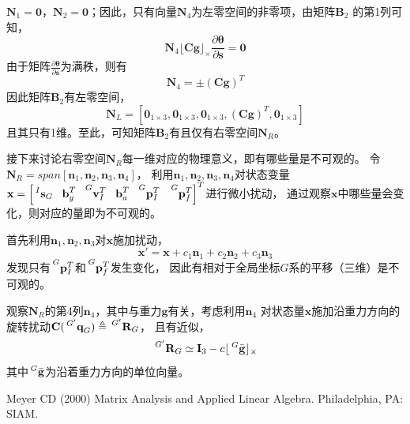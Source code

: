 \documentclass{article}
\begin{document}
$\textbf{N}_1=\textbf{0}$，$\textbf{N}_2=\textbf{0}$；因此，只有向量$\textbf{N}_4$为左零空间的非零项，由矩阵$\textbf{B}_2$
的第1列可知，
\begin{equation}
    \textbf{N}_{4}\lfloor\textbf{Cg}\rfloor_{\times}\frac{\partial\mathbf{\theta}}{\partial\textbf{s}}=\textbf{0}
\end{equation}
由于矩阵$\frac{\partial\mathbf{\theta}}{\partial\textbf{s}}$为满秩，则有
\begin{equation}
    \textbf{N}_4=\pm(\textbf{Cg})^T
\end{equation}
因此矩阵$\textbf{B}_2$有左零空间，
\begin{equation}
    \textbf{N}_L=\left[\textbf{0}_{1\times 3},\textbf{0}_{1\times 3},\textbf{0}_{1\times 3},(\textbf{Cg})^T,\textbf{0}_{1\times 3}\right]
\end{equation}
且其只有1维。至此，可知矩阵$\textbf{B}_2$有且仅有右零空间$\textbf{N}_R$。

\par
接下来讨论右零空间$\textbf{N}_R$每一维对应的物理意义，即有哪些量是不可观的。
令$\textbf{N}_R=span\left[\textbf{n}_{1},\textbf{n}_{2},\textbf{n}_{3},\textbf{n}_{4}\right]$，
利用$\textbf{n}_{1},\textbf{n}_{2},\textbf{n}_{3},\textbf{n}_{4}$对状态变量
$\textbf{x}=\left[\sideset{^I}{}{\mathop{\textbf{s}_{G}}}\ \ \textbf{b}_{g}^{T}
\ \ \sideset{^G}{}{\mathop{\textbf{v}_{I}^{T}}}\ \ \textbf{b}_{a}^{T}\ \ \sideset{^G}{}{\mathop{\textbf{p}_{I}^{T}}}
\ \ \sideset{^G}{}{\mathop{\textbf{p}_{f}^{T}}}\right]^T$进行微小扰动，
通过观察$\textbf{x}$中哪些量会变化，则对应的量即为不可观的。
\par
首先利用$\textbf{n}_{1},\textbf{n}_{2},\textbf{n}_{3}$对$\textbf{x}$施加扰动，
\begin{equation}
    \textbf{x}'=\textbf{x}+c_1\textbf{n}_1+c_2\textbf{n}_2+c_3\textbf{n}_3
\end{equation}
发现只有$\sideset{^G}{}{\mathop{\textbf{p}_{I}^{T}}}$和$\sideset{^G}{}{\mathop{\textbf{p}_{f}^{T}}}$发生变化，
因此有相对于全局坐标$G$系的平移（三维）是不可观的。
\par
观察$\textbf{N}_R$的第4列$\textbf{n}_4$，其中与重力$\textbf{g}$有关，考虑利用$\textbf{n}_4$
对状态量$\textbf{x}$施加沿重力方向的旋转扰动$\textbf{C}(\sideset{^{G'}}{}{\mathop{\textbf{q}_G}})\triangleq\sideset{^{G'}}{}{\mathop{\textbf{R}_G}}$，
且有近似，
\begin{equation}
    \sideset{^{G'}}{}{\mathop{\textbf{R}_G}}\simeq \textbf{I}_3-c\lfloor\sideset{^G}{}{\mathop{\bar{\textbf{g}}}}\rfloor_{\times}
\end{equation}
其中$\sideset{^G}{}{\mathop{\bar{\textbf{g}}}}$为沿着重力方向的单位向量。



\begin{thebibliography}{99}  
    Meyer CD (2000) Matrix Analysis and Applied Linear Algebra. Philadelphia, PA: SIAM.
\end{thebibliography}
\end{document}
